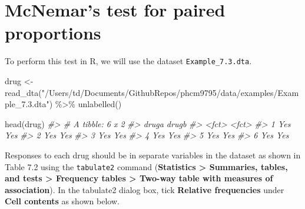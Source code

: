 \documentclass[
]{memoir}
\newenvironment{Shaded}{\begin{snugshade}}{\end{snugshade}}
\newcommand{\CommentTok}[1]{\textcolor[rgb]{0.56,0.35,0.01}{\textit{#1}}}
\newcommand{\FunctionTok}[1]{\textcolor[rgb]{0.00,0.00,0.00}{#1}}
\newcommand{\NormalTok}[1]{#1}
\newcommand{\OtherTok}[1]{\textcolor[rgb]{0.56,0.35,0.01}{#1}}
\newcommand{\SpecialCharTok}[1]{\textcolor[rgb]{0.00,0.00,0.00}{#1}}
\newcommand{\StringTok}[1]{\textcolor[rgb]{0.31,0.60,0.02}{#1}}
\begin{document}
\hypertarget{mcnemars-test-for-paired-proportions}{%
\section{McNemar's test for paired proportions}\label{mcnemars-test-for-paired-proportions}}

To perform this test in R, we will use the dataset \texttt{Example\_7.3.dta}.

\begin{Shaded}
\begin{Highlighting}[]
\NormalTok{drug }\OtherTok{\textless{}{-}} \FunctionTok{read\_dta}\NormalTok{(}\StringTok{"/Users/td/Documents/GithubRepos/phcm9795/data/examples/Example\_7.3.dta"}\NormalTok{) }\SpecialCharTok{\%\textgreater{}\%} 
  \FunctionTok{unlabelled}\NormalTok{()}

\FunctionTok{head}\NormalTok{(drug)}
\CommentTok{\#\textgreater{} \# A tibble: 6 x 2}
\CommentTok{\#\textgreater{}   druga drugb}
\CommentTok{\#\textgreater{}   \textless{}fct\textgreater{} \textless{}fct\textgreater{}}
\CommentTok{\#\textgreater{} 1 Yes   Yes  }
\CommentTok{\#\textgreater{} 2 Yes   Yes  }
\CommentTok{\#\textgreater{} 3 Yes   Yes  }
\CommentTok{\#\textgreater{} 4 Yes   Yes  }
\CommentTok{\#\textgreater{} 5 Yes   Yes  }
\CommentTok{\#\textgreater{} 6 Yes   Yes}
\end{Highlighting}
\end{Shaded}

Responses to each drug should be in separate variables in the dataset as shown in Table 7.2 using the \texttt{tabulate2} command (\textbf{Statistics \textgreater{} Summaries, tables, and tests \textgreater{} Frequency tables \textgreater{} Two-way table with measures of association}). In the tabulate2 dialog box, tick \textbf{Relative frequencies} under \textbf{Cell contents} as shown below.

\begin{Shaded}
\end{Shaded}
\end{document}
